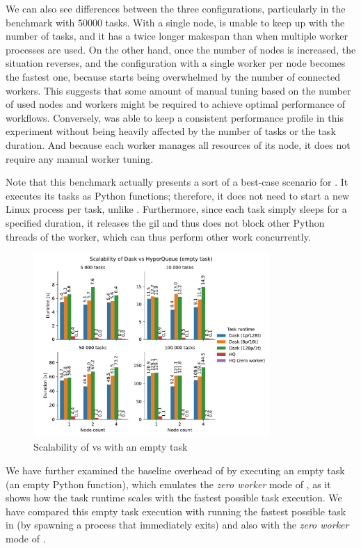 We can also see differences between the three \dask{} configurations, particularly
in the benchmark with $50000$ tasks. With a single node, \dask{} is
unable to keep up with the number of tasks, and it has a twice longer makespan than when multiple
worker processes are used. On the other hand, once the number of nodes is increased, the situation
reverses, and the configuration with a single worker per node becomes the fastest one, because
\dask{} starts being overwhelmed by the number of connected workers. This suggests
that some amount of manual tuning based on the number of used nodes and workers might be required
to achieve optimal performance of \dask{} workflows. Conversely,
\hyperqueue{} was able to keep a consistent performance profile in this experiment
without being heavily affected by the number of tasks or the task duration. And because each
\hq{} worker manages all resources of its node, it does not require
any manual worker tuning.

Note that this benchmark actually presents a sort of a best-case scenario for
\dask{}. It executes its tasks as Python functions; therefore, it does not need to
start a new Linux process per task, unlike \hyperqueue{}. Furthermore, since each task
simply sleeps for a specified duration, it releases the \gls{gil} and thus does not
block other Python threads of the worker, which can thus perform other work concurrently.

\begin{figure}[h]
	\centering
	\includegraphics[width=0.8\textwidth]{imgs/hq/charts/dask-vs-hq-empty}
	\caption{Scalability of \hyperqueue{} vs \dask{} with an empty task}
	\label{fig:hq-dask-empty}
\end{figure}

We have further examined the baseline overhead of \dask{} by executing an empty
task (an empty Python function), which emulates the \emph{zero worker} mode of
\hyperqueue{}, as it shows how the task runtime scales with the fastest possible task
execution. We have compared this empty task execution with running the fastest possible task in
\hyperqueue{} (by spawning a process that immediately exits) and also with the \emph{zero worker} mode of \hyperqueue{}.

